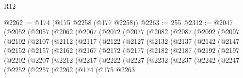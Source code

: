 \begin{lexlean}{R12}
\begin{coremodule}
{{{{{{{{{{{{{{{{{{{{{{{{{{{{{{{{{{{{{{{{{{{{{{{{{{{{{{{{{{{{{{{{{{{{{{{{{{{{{{{{{{{{{{{{{{{{{{{{{{{{{{{{{{@2262 := @174 (@175 @2258 (@177 @2258))
@2263 := 255
@2312 := @2047
    (@2052
      (@2057
        (@2062
          (@2067
            (@2072
              (@2077
                (@2082
                  (@2087
                    (@2092
                      (@2097
                        (@2102
                          (@2107
                            (@2112
                              (@2117
                                (@2122
                                  (@2127
                                    (@2132
                                      (@2137
                                        (@2142
                                          (@2147
                                            (@2152
                                              (@2157
                                                (@2162
                                                  (@2167
                                                    (@2172
                                                      (@2177
                                                        (@2182
                                                          (@2187
                                                            (@2192
                                                              (@2197
                                                                (@2202
                                                                  (@2207
                                                                    (@2212
                                                                      (@2217
                                                                        (@2222
                                                                          (@2227
                                                                            (@2232
                                                                              (@2237
                                                                                (@2242
                                                                                  (@2247
                                                                                    (@2252
                                                                                      (@2257
                                                                                        (@2262
                                                                                          (@174
                                                                                            (@175
                                                                                              @2263
}}}}}}}}}}}}}}}}}}}}}}}}}}}}}}}}}}}}}}}}}}}}}}}}}}}}}}}}}}}}}}}}}}}}}}}}}}}}}}}}}}}}}}}}}}}}}}}}}}}}}}}}}}
\end{coremodule}
\end{lexlean}
